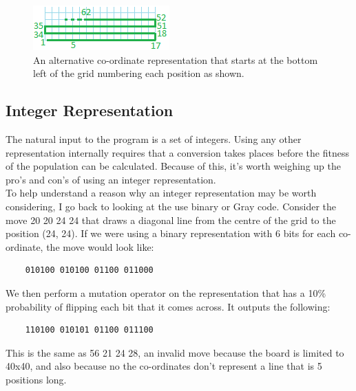 \documentclass[]{report}
\begin{document}
\begin{figure}
	\centering
	\includegraphics{figures/alternativeRepresentation.png}
	\caption{An alternative co-ordinate representation that starts at the bottom left of the grid numbering each position as shown.}
	\label{alternativePositioning}
\end{figure}

\subsection{Integer Representation}

The natural input to the program is a set of integers. Using any other representation internally requires that a conversion takes places before the fitness of the population can be calculated. Because of this, it's worth weighing up the pro's and con's of using an integer representation.\\

To help understand a reason why an integer representation may be worth considering, I go back to looking at the use binary or Gray code. Consider the move 20 20 24 24 that draws a diagonal line from the centre of the grid to the position (24, 24). If we were using a binary representation with 6 bits for each co-ordinate, the move would look like:

\begin{center}
\begin{verbatim}
	010100 010100 01100 011000
\end{verbatim}
\end{center}

We then perform a mutation operator on the representation that has a 10\% probability of flipping each bit that it comes across. It outputs the following:

\begin{verbatim}
	110100 010101 01100 011100
\end{verbatim}

This is the same as 56 21 24 28, an invalid move because the board is limited to 40x40, and also because no the co-ordinates don't represent a line that is 5 positions long. \\
\end{document}
